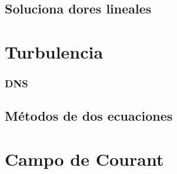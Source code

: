 	\subsection{Soluciona dores lineales}

\section{Turbulencia}
	\subsubsection{DNS}
	\subsection{Métodos de dos ecuaciones}
	
\section{Campo de Courant}
